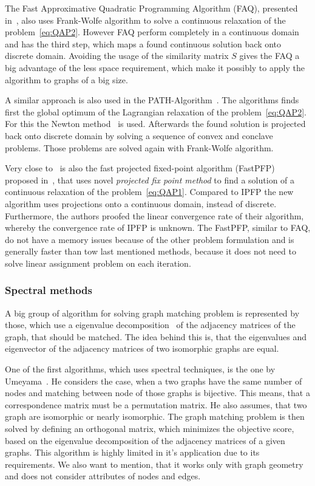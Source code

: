 The Fast Approximative Quadratic Programming Algorithm (FAQ), presented in~\cite{Vogelstein_BrainGraphs}, also uses Frank-Wolfe algorithm to solve a continuous relaxation of the problem~\eqref{eq:QAP2}. However FAQ perform completely in a continuous domain and has the third step, which maps a found continuous solution back onto discrete domain. Avoiding the usage of the similarity matrix $S$ gives the FAQ a big advantage of the less space requirement, which make it possibly to apply the algorithm to graphs of a big size. 

A similar approach is also used in the PATH-Algorithm~\cite{Zaslavskiy2010}. The algorithms finds first the global optimum of the Lagrangian relaxation of the problem~\eqref{eq:QAP2}. For this the Newton method~\cite{Book_ConvOpt} is used. Afterwards the found solution is projected back onto discrete domain by solving a sequence of convex and conclave problems. Those problems are solved again with Frank-Wolfe algorithm.

Very close to~\cite{Leordeanu2009_IPFP} is also the fast projected fixed-point algorithm (FastPFP) proposed in~\cite{FastPFP}, that uses novel \emph{projected fix point method} to find a solution of a continuous relaxation of the problem~\eqref{eq:QAP1}. Compared to IPFP the new algorithm uses projections onto a continuous domain, instead of discrete. Furthermore, the authors proofed the linear convergence rate of their algorithm, whereby the convergence rate of IPFP is unknown. The FastPFP, similar to FAQ, do not have a memory issues because of the other problem formulation and is generally faster than tow last mentioned methods, because it does not need to solve linear assignment problem on each iteration.

\subsubsection{Spectral methods}
A big group of algorithm for solving graph matching problem is represented by those, which use a eigenvalue decomposition~\cite{Book_ConvOpt} of the adjacency matrices of the graph, that should be matched. The idea behind this is, that the eigenvalues and eigenvector of the adjacency matrices of two isomorphic graphs are equal.

One of the first algorithms, which uses spectral techniques, is the one by Umeyama~\cite{Umeyam1988}. He considers the case, when a two graphs have the same number of nodes and matching between node of those graphs is bijective. This means, that a correspondence matrix must be a permutation matrix. He also assumes, that two graph are isomorphic or nearly isomorphic. The graph matching problem is then solved by defining an orthogonal matrix, which minimizes the objective score, based on the eigenvalue decomposition of the adjacency matrices of a given graphs. This algorithm is highly limited in it's application due to its requirements. We also want to mention, that it works only with graph geometry and does not consider attributes of nodes and edges.

